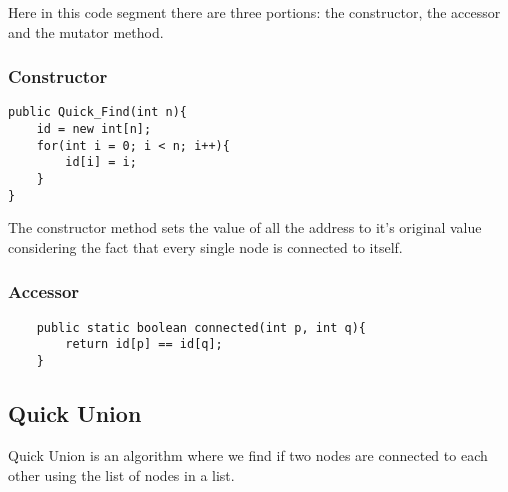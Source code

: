 \documentclass{article}
\begin{document}
Here in this code segment there are three portions: the constructor, the accessor and the mutator method.

\subsubsection{Constructor}
\begin{verbatim}
public Quick_Find(int n){
    id = new int[n];
    for(int i = 0; i < n; i++){
        id[i] = i;
    }
}   
\end{verbatim}
The constructor method sets the value of all the address to it's original value considering the fact that every single node is connected to itself.

\subsubsection{Accessor}
\begin{verbatim}
    public static boolean connected(int p, int q){
        return id[p] == id[q]; 
    }
\end{verbatim}
    
\subsection{Quick Union}
Quick Union is an algorithm where we find if two nodes are connected to each other using the list of nodes in a list.
\end{document}
